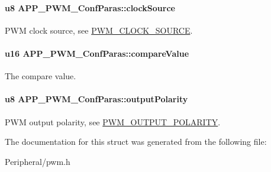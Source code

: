 \paragraph[{\texorpdfstring{clock\+Source}{clockSource}}]{\setlength{\rightskip}{0pt plus 5cm}u8 A\+P\+P\+\_\+\+P\+W\+M\+\_\+\+Conf\+Paras\+::clock\+Source}\hypertarget{struct_a_p_p___p_w_m___conf_paras_a4a1122dc4e7795bf1e1f47538b147ea8}{}\label{struct_a_p_p___p_w_m___conf_paras_a4a1122dc4e7795bf1e1f47538b147ea8}
P\+WM clock source, see \hyperlink{group___p_w_m_ga491cb08538d34ebef5010c3909a0ef4b}{P\+W\+M\+\_\+\+C\+L\+O\+C\+K\+\_\+\+S\+O\+U\+R\+CE}. 
\paragraph[{\texorpdfstring{compare\+Value}{compareValue}}]{\setlength{\rightskip}{0pt plus 5cm}u16 A\+P\+P\+\_\+\+P\+W\+M\+\_\+\+Conf\+Paras\+::compare\+Value}\hypertarget{struct_a_p_p___p_w_m___conf_paras_ae1b5fa4abd18a81a39127faab92469c6}{}\label{struct_a_p_p___p_w_m___conf_paras_ae1b5fa4abd18a81a39127faab92469c6}
The compare value. 
\paragraph[{\texorpdfstring{output\+Polarity}{outputPolarity}}]{\setlength{\rightskip}{0pt plus 5cm}u8 A\+P\+P\+\_\+\+P\+W\+M\+\_\+\+Conf\+Paras\+::output\+Polarity}\hypertarget{struct_a_p_p___p_w_m___conf_paras_afff5a21a187609a5b3e82285062081d9}{}\label{struct_a_p_p___p_w_m___conf_paras_afff5a21a187609a5b3e82285062081d9}
P\+WM output polarity, see \hyperlink{group___p_w_m_ga7129b83fb324f0d2ba78c95815b02f15}{P\+W\+M\+\_\+\+O\+U\+T\+P\+U\+T\+\_\+\+P\+O\+L\+A\+R\+I\+TY}. 

The documentation for this struct was generated from the following file\+:\begin{DoxyCompactItemize}
\item 
Peripheral/pwm.\+h\end{DoxyCompactItemize}
